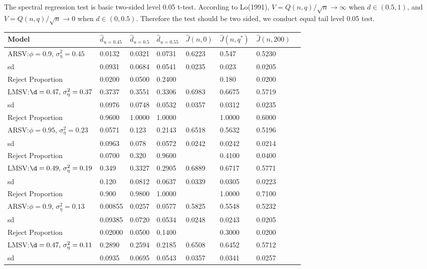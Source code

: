 \documentclass[10pt,a4paper]{article}
\begin{document}
The spectral regression test is basic two-sided level 0.05 t-test. According to Lo(1991)\cite{lo1989long}, $V=Q(n,q)/\sqrt{n} \to \infty$ when $d\in(0.5,1)$, and $V=Q(n,q)/\sqrt{n} \to 0$ when $d \in (0,0.5)$. Therefore the test should be two sided, we conduct equal tail level 0.05 test. 
\begin{table}[!hbp]
\begin{tabular}{llllllll}
\hline
\hline
Model & $\hat{d}_{u=0.45}$ & $\hat{d}_{u=0.5}$ & $\hat{d}_{u=0.55}$ & $\hat{J}(n,0) $& $\hat{J}(n,q^*) $&$\hat{J}(n,200)$ \\
\hline
ARSV:$\phi=0.9,\,\sigma_\eta^2=0.45$ & 0.0132 & 0.0321 &  0.0731 & 0.6223 &     0.547 & 0.5230 \\
sd& 0.0931 & 0.0684  & 0.0541 & 0.0235  &   0.023 &  0.0205\\
Reject Proportion & 0.0200 &  0.0500  & 0.2400 & \,  &   0.180 & 0.0200\\
LMSV:$\d=0.47,\,\sigma_\eta^2=0.37$ & 0.3737 & 0.3551 &  0.3306 & 0.6983 &   0.6675 & 0.5719 \\
sd& 0.0976 & 0.0748  & 0.0532 & 0.0357 &   0.0312 & 0.0235\\
Reject Proportion & 0.9600 & 1.0000  & 1.0000 & \,  &  1.0000 & 0.6000\\
\hline
ARSV:$\phi=0.95,\,\sigma_\eta^2=0.23$ & 0.0571 &  0.123 &  0.2143 & 0.6518  &  0.5632 & 0.5196 \\
sd& 0.0963 &  0.078 &  0.0572 & 0.0242 &   0.0242 & 0.0214\\
Reject Proportion & 0.0700 &  0.320 &  0.9600 & \,  &  0.4100 & 0.0400\\
LMSV:$\d=0.49,\,\sigma_\eta^2=0.19$ & 0.349 & 0.3327 &  0.2905 & 0.6889 &    0.6717 & 0.5771 \\
sd& 0.120 & 0.0812 &  0.0637 & 0.0339  &  0.0305 & 0.0223\\
Reject Proportion & 0.900 & 0.9800 &  1.0000 & \,  &  1.0000 & 0.7100\\
\hline
ARSV:$\phi=0.9,\,\sigma_\eta^2=0.13$ & 0.00855 & 0.0257 &  0.0577 & 0.5825  &  0.5548 & 0.5232 \\
sd& 0.09385 & 0.0720 &  0.0534 & 0.0248  &  0.0243 & 0.0205\\
Reject Proportion & 0.02000 & 0.0500  & 0.1400 & \,  &  0.3000 & 0.0200\\
LMSV:$\d=0.47,\,\sigma_\eta^2=0.11$ &  0.2890 & 0.2594 &  0.2185 & 0.6508 &   0.6452 & 0.5712 \\
sd& 0.0935 & 0.0695 &  0.0543 & 0.0357  &  0.0341 & 0.0257\\

\end{tabular}
\end{table}
\end{document}
